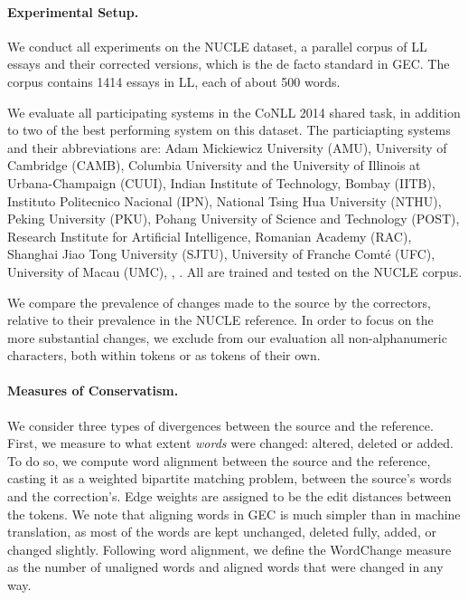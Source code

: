 \documentclass[letterpaper, 11pt]{article}
\newcommand{\oa}[1]{\footnote{\color{red}OA: #1}}
\begin{document}
\paragraph{Experimental Setup.}\label{par:experimental_setup}
We conduct all experiments on the NUCLE dataset,
a parallel corpus of LL essays and their corrected versions,
which is the de facto standard in GEC.
The corpus contains 1414 essays in LL, each of about 500 words.

We evaluate all participating systems in the CoNLL 2014 shared task,
in addition to two of the best performing system on this dataset.
The particiapting systems and their abbreviations are: Adam Mickiewicz University (AMU),
University of Cambridge (CAMB), Columbia University and the University of Illinois at Urbana-Champaign (CUUI),
Indian Institute of Technology, Bombay (IITB), Instituto Politecnico Nacional (IPN),
National Tsing Hua University (NTHU), Peking University (PKU), Pohang University of Science and Technology (POST),
Research Institute for Artificial Intelligence, Romanian Academy (RAC), Shanghai Jiao Tong University (SJTU),
University of Franche Comt\'{e} (UFC), University of Macau (UMC), , .
All are trained and tested on the NUCLE corpus.

We compare the prevalence of changes made to the source by the correctors,
relative to their prevalence in the NUCLE reference.
In order to focus on the more substantial changes, we exclude from our evaluation
all non-alphanumeric characters, both within tokens or as tokens of their own.
%

\paragraph{Measures of Conservatism.}
We consider three types of divergences between the source and the reference.
First, we measure to what extent \emph{words} were changed: altered, deleted or added.
To do so, we compute word alignment between the source and the reference, casting it
as a weighted bipartite matching problem, between the source's words and the correction's. 
Edge weights are assigned to be the edit distances
between the tokens.
We note that aligning words in GEC is much simpler than in machine translation,
as most of the words are kept unchanged, deleted fully, added, or changed slightly.
Following word alignment, we define the {\sc WordChange} measure
as the number of unaligned words and aligned words that were changed in any way.
\end{document}
